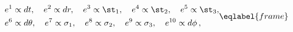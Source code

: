 \begin{equation}
\begin{split}
&e^1\propto dt,\quad e^2\propto dr,\quad e^3\propto \st_1,
\quad e^4\propto \st_2,\quad e^5\propto \st_3,\\
&e^6\propto d\theta,\quad e^7\propto \sigma_1,
\quad e^8\propto \sigma_2,\quad e^9\propto \sigma_3,\quad
e^{10}\propto  d\phi\,,
\end{split}
\eqlabel{frame}
\end{equation}

